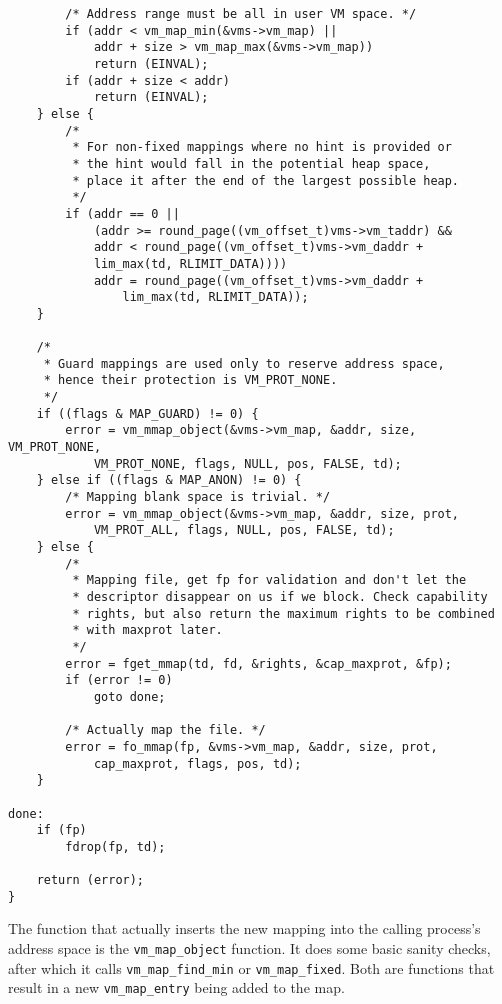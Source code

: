 \documentclass[shortabstract, english]{iithesis}
\newenvironment{code}{}{}
\begin{document}
\begin{code}
\begin{verbatim}
        /* Address range must be all in user VM space. */
        if (addr < vm_map_min(&vms->vm_map) ||
            addr + size > vm_map_max(&vms->vm_map))
            return (EINVAL);
        if (addr + size < addr)
            return (EINVAL);
    } else {
        /*
         * For non-fixed mappings where no hint is provided or
         * the hint would fall in the potential heap space,
         * place it after the end of the largest possible heap.
         */
        if (addr == 0 ||
            (addr >= round_page((vm_offset_t)vms->vm_taddr) &&
            addr < round_page((vm_offset_t)vms->vm_daddr +
            lim_max(td, RLIMIT_DATA))))
            addr = round_page((vm_offset_t)vms->vm_daddr +
                lim_max(td, RLIMIT_DATA));
    }

    /*
     * Guard mappings are used only to reserve address space,
     * hence their protection is VM_PROT_NONE.
     */
    if ((flags & MAP_GUARD) != 0) {
        error = vm_mmap_object(&vms->vm_map, &addr, size, VM_PROT_NONE,
            VM_PROT_NONE, flags, NULL, pos, FALSE, td);
    } else if ((flags & MAP_ANON) != 0) {
        /* Mapping blank space is trivial. */
        error = vm_mmap_object(&vms->vm_map, &addr, size, prot,
            VM_PROT_ALL, flags, NULL, pos, FALSE, td);
    } else {
        /*
         * Mapping file, get fp for validation and don't let the
         * descriptor disappear on us if we block. Check capability
         * rights, but also return the maximum rights to be combined
         * with maxprot later.
         */
        error = fget_mmap(td, fd, &rights, &cap_maxprot, &fp);
        if (error != 0)
            goto done;

        /* Actually map the file. */
        error = fo_mmap(fp, &vms->vm_map, &addr, size, prot,
            cap_maxprot, flags, pos, td);
    }

done:
    if (fp)
        fdrop(fp, td);

    return (error);
}
\end{verbatim}
\end{code}

The function that actually inserts the new mapping into the calling process's
address space is the \texttt{vm_map_object} function. It does some basic
sanity checks, after which it calls \texttt{vm_map_find_min} or
\texttt{vm_map_fixed}. Both are functions that result in a new
\texttt{vm_map_entry} being added to the map.
\end{document}
